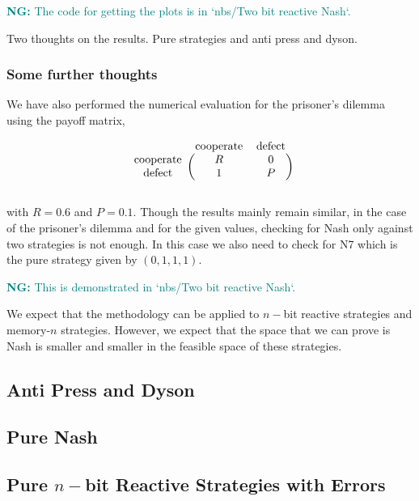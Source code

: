 \documentclass{article}
\theoremstyle{definition}
\newcommand{\nikoleta}[1]{\textcolor{teal}{{\bf NG:} #1}}
\begin{document}
\nikoleta{The code for getting the plots is in `nbs/Two bit reactive Nash`.}

Two thoughts on the results. Pure strategies and anti press and dyson.

\subsubsection{Some further thoughts}

We have also performed the numerical evaluation for the prisoner's dilemma using
the payoff matrix,

\begin{equation}
  \begin{blockarray}{ccc}
      & \text{cooperate} & \text{defect} \\
      \begin{block}{c(cc)}
          \text{cooperate} & R & 0 \\
          \text{defect} & 1 & P \\
      \end{block}
  \end{blockarray}
\end{equation}

with \(R=0.6\) and \(P=0.1\). Though the results mainly remain similar, in the
case of the prisoner's dilemma and for the given values, checking for Nash only
against two strategies is not enough. In this case we also need to check for N7
which is the pure strategy given by \((0, 1, 1, 1)\).

\nikoleta{This is demonstrated in `nbs/Two bit reactive Nash`.}

We expect that the methodology can be applied to \(n-\)bit reactive strategies
and memory-\(n\) strategies. However, we expect that the space that we can prove
is Nash is smaller and smaller in the feasible space of these strategies.

\subsection{Anti Press and Dyson}

\subsection{Pure Nash}

\subsection{Pure \(n-\)bit Reactive Strategies with Errors}\label{section:pure_strategies}
\end{document}
